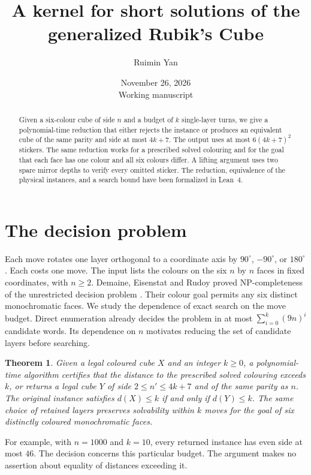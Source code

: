 \documentclass[11pt,letterpaper]{article}
\title{\bfseries A kernel for short solutions of the generalized Rubik's Cube}
\author{Ruimin Yan}
\date{November 26, 2026\\[3pt]\small Working manuscript}
\newtheorem{theorem}{Theorem}
\begin{document}
\maketitle
\begin{abstract}
Given a six-colour cube of side $n$ and a budget of $k$ single-layer turns,
we give a polynomial-time reduction that either rejects the instance or produces
an equivalent cube of the same parity and side at most $4k+7$.
The output uses at most $6(4k+7)^2$ stickers. The same reduction works for
a prescribed solved colouring and for the goal that each face has one colour
and all six colours differ. A lifting argument uses two spare mirror depths
to verify every omitted sticker. The reduction, equivalence of the physical
instances, and a search bound have been formalized in Lean~4.
\end{abstract}

\section{The decision problem}
Each move rotates one layer orthogonal to a coordinate axis by
$90^\circ$, $-90^\circ$, or $180^\circ$. Each costs one move. The input lists
the colours on the six $n$ by $n$ faces in fixed coordinates, with $n\ge2$.
Demaine, Eisenstat and Rudoy proved NP-completeness of the unrestricted
decision problem \cite{der}. Their colour goal permits any six distinct
monochromatic faces. We study the dependence of exact search on the move
budget. Direct enumeration already decides the problem in at most
$\sum_{i=0}^k(9n)^i$ candidate words. Its dependence on $n$ motivates
reducing the set of candidate layers before searching.

\begin{theorem}\label{thm:main}
Given a legal coloured cube $X$ and an integer $k\ge0$, a polynomial-time
algorithm certifies that the distance to the prescribed solved colouring
exceeds $k$, or returns a legal cube $Y$ of side $2\le n'\le4k+7$
and of the same parity as $n$. The original instance satisfies $d(X)\le k$
if and only if $d(Y)\le k$. The same choice of retained layers preserves solvability within $k$ moves
for the goal of six distinctly coloured monochromatic faces.
\end{theorem}

For example, with $n=1000$ and $k=10$, every returned instance has even
side at most $46$. The decision concerns this particular budget. The
argument makes no assertion about equality of distances exceeding it.
\end{document}

